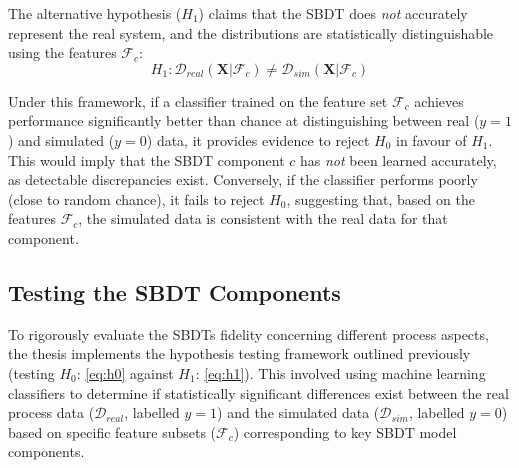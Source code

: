\noindent The alternative hypothesis ($H_1$) claims that the SBDT does \textit{not} accurately represent the real system, and the distributions are statistically distinguishable using the features $\mathcal{F}_c$:
\begin{equation}
  H_1: \mathcal{D}_{real}(\mathbf{X} | \mathcal{F}_c) \neq \mathcal{D}_{sim}(\mathbf{X} | \mathcal{F}_c)
  \label{eq:h1}
\end{equation}

\noindent Under this framework, if a classifier trained on the feature set $\mathcal{F}_c$ achieves performance significantly better than chance at distinguishing between real ($y=1$) and simulated ($y=0$) data, it provides evidence to reject $H_0$ in favour of $H_1$. This would imply that the SBDT component $c$ has \textit{not} been learned accurately, as detectable discrepancies exist. Conversely, if the classifier performs poorly (close to random chance), it fails to reject $H_0$, suggesting that, based on the features $\mathcal{F}_c$, the simulated data is consistent with the real data for that component.

\subsection*{Testing the SBDT Components}
To rigorously evaluate the SBDTs fidelity concerning different process aspects, the thesis implements the hypothesis testing framework outlined previously (testing $H_0$: \autoref{eq:h0} against $H_1$: \autoref{eq:h1}). This involved using machine learning classifiers to determine if statistically significant differences exist between the real process data ($\mathcal{D}_{real}$, labelled $y=1$) and the simulated data ($\mathcal{D}_{sim}$, labelled $y=0$) based on specific feature subsets ($\mathcal{F}_c$) corresponding to key SBDT model components.

